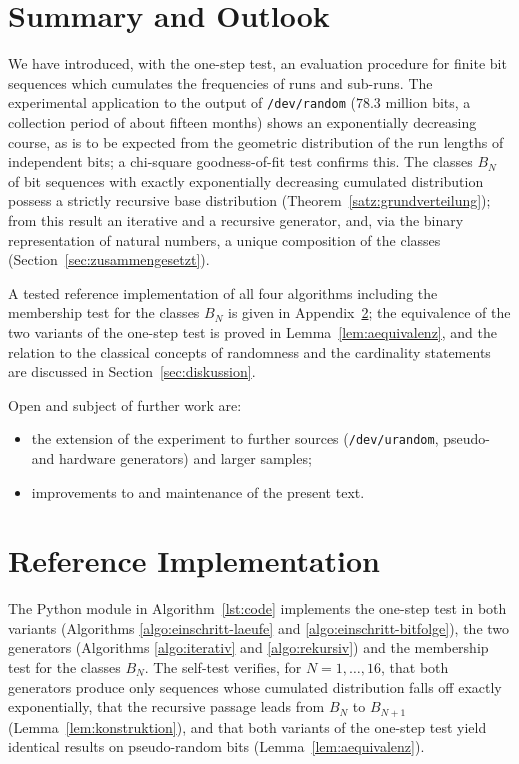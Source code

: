 \documentclass[11pt,a4paper]{scrartcl}
\theoremstyle{plain}
\theoremstyle{definition}
\theoremstyle{remark}
\begin{document}
\section{Summary and Outlook}\label{sec:schluss}

We have introduced, with the one-step test, an evaluation procedure
for finite bit sequences which cumulates the frequencies of runs and
sub-runs. The experimental application to the output of
\texttt{/dev/random} ($78.3$ million bits, a collection period of
about fifteen months) shows an exponentially decreasing course, as is
to be expected from the geometric distribution of the run lengths of
independent bits; a chi-square goodness-of-fit test confirms this.
The classes $B_N$ of bit sequences with exactly exponentially
decreasing cumulated distribution possess a strictly recursive base
distribution (Theorem~\ref{satz:grundverteilung}); from this result
an iterative and a recursive generator, and, via the binary
representation of natural numbers, a unique composition of the
classes (Section~\ref{sec:zusammengesetzt}).

A tested reference implementation of all four algorithms including
the membership test for the classes $B_N$ is given in
Appendix~\ref{sec:code}; the equivalence of the two variants of the
one-step test is proved in Lemma~\ref{lem:aequivalenz}, and the
relation to the classical concepts of randomness and the cardinality
statements are discussed in Section~\ref{sec:diskussion}.

Open and subject of further work are:
\begin{itemize}
  \item the extension of the experiment to further sources
        (\texttt{/dev/urandom}, pseudo- and hardware generators) and
        larger samples;
  \item improvements to and maintenance of the present text.
\end{itemize}

\appendix
\section{Reference Implementation}\label{sec:code}

The Python module in Algorithm~\ref{lst:code} implements the
one-step test in both variants (Algorithms
\ref{algo:einschritt-laeufe} and \ref{algo:einschritt-bitfolge}), the
two generators (Algorithms \ref{algo:iterativ} and
\ref{algo:rekursiv}) and the membership test for the classes $B_N$.
The self-test verifies, for $N=1,\dots,16$, that both generators
produce only sequences whose cumulated distribution falls off exactly
exponentially, that the recursive passage leads from $B_N$ to
$B_{N+1}$ (Lemma~\ref{lem:konstruktion}), and that both variants of
the one-step test yield identical results on pseudo-random bits
(Lemma~\ref{lem:aequivalenz}).



\printbibliography[title={References}]
\end{document}
